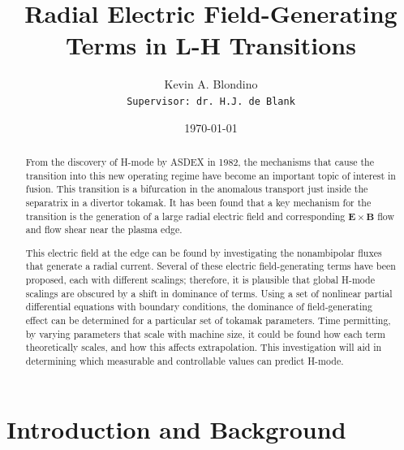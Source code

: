\documentclass[a4paper]{article}
\author{Kevin A. Blondino \\
	\texttt{Supervisor: dr. H.J. de Blank}}
\title{Radial Electric Field-Generating Terms in L-H Transitions}
\date{\today}
\begin{document}
\maketitle


\begin{abstract}
	From the discovery of H-mode by ASDEX in 1982, the mechanisms that cause the transition into this new operating regime have become an important topic of interest in fusion.
	This transition is a bifurcation in the anomalous transport just inside the separatrix in a divertor tokamak.
	It has been found that a key mechanism for the transition is the generation of a large radial electric field and corresponding $\mathbf{E}\times\mathbf{B}$ flow and flow shear near the plasma edge.

	This electric field at the edge can be found by investigating the nonambipolar fluxes that generate a radial current.
	Several of these electric field-generating terms have been proposed, each with different scalings; therefore, it is plausible that global H-mode scalings are obscured by a shift in dominance of terms.
	Using a set of nonlinear partial differential equations with boundary conditions, the dominance of field-generating effect can be determined for a particular set of tokamak parameters.
	Time permitting, by varying parameters that scale with machine size, it could be found how each term theoretically scales, and how this affects extrapolation.
	This investigation will aid in determining which measurable and controllable values can predict H-mode.
\end{abstract}

\section{Introduction and Background}
\end{document}
